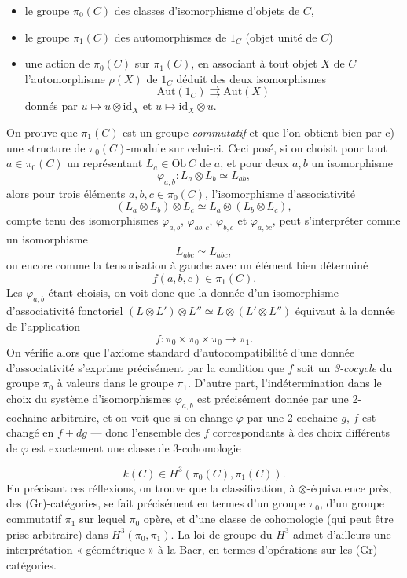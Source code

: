 \documentclass[11pt,a4paper]{article}
\begin{document}
\begin{itemize}
\item[a)] le groupe $\pi_0(C)$ des classes d'isomorphisme d'objets de $C$,
\item[b)] le groupe $\pi_1(C)$ des automorphismes de $1_C$ (objet unité de
$C$)
\item[c)] une action de $\pi_0(C)$ sur $\pi_1(C)$, en associant à tout objet
$X$ de $C$ l'automorphisme $\rho(X)$ de $1_C$ déduit des deux isomorphismes
\[ \mathrm{Aut}(1_C) \rightrightarrows \mathrm{Aut}(X) \]
donnés par $u \mapsto u \otimes \mathrm{id}_X$ et $u \mapsto \mathrm{id}_X
\otimes u$.
\end{itemize}

On prouve que $\pi_1(C)$ est un groupe \emph{commutatif} et que l'on obtient
bien par c) une structure de $\pi_0(C)$-module sur celui-ci. Ceci posé, si
on choisit pour tout $a \in \pi_0(C)$ un représentant $L_a \in \mathrm{Ob}\,
C$ de $a$, et pour deux $a, b$ un isomorphisme
\[ \varphi_{a,b} : L_a \otimes L_b \simeq L_{ab} , \]
alors pour trois éléments $a, b, c \in \pi_0(C)$, l'isomorphisme
d'associativité
\[ (L_a \otimes L_b) \otimes L_c \simeq L_a \otimes (L_b \otimes L_c) , \]
compte tenu des isomorphismes $\varphi_{a,b}$, $\varphi_{ab,c}$,
$\varphi_{b,c}$ et $\varphi_{a,bc}$, peut s'interpréter comme un
isomorphisme
\[ L_{abc} \simeq L_{abc} , \]
ou encore comme la tensorisation à gauche avec un élément bien déterminé
\[ f(a,b,c) \in \pi_1(C) . \]
Les $\varphi_{a,b}$ étant choisis, on voit donc que la donnée d'un
isomorphisme d'associativité fonctoriel $(L \otimes L') \otimes L'' \simeq
L \otimes (L' \otimes L'')$ équivaut à la donnée de l'application
\[ f : \pi_0 \times \pi_0 \times \pi_0 \longrightarrow \pi_1 . \]
On vérifie alors que l'axiome standard d'autocompatibilité d'une donnée
d'associativité  s'exprime précisément par la
condition que $f$ soit un \emph{3-cocycle} du groupe $\pi_0$ à valeurs dans
le groupe $\pi_1$. D'autre part, l'indétermination dans le choix du système
d'isomorphismes $\varphi_{a,b}$ est précisément donnée par une 2-cochaine
arbitraire, et on voit que si on change $\varphi$ par une 2-cochaine $g$,
$f$ est changé en $f + dg$ --- donc l'ensemble des $f$ correspondants à des
choix différents de $\varphi$ est exactement une classe de 3-cohomologie

\[ k(C) \in H^3(\pi_0(C), \pi_1(C)) . \]
En précisant ces réflexions, on trouve que la classification, à
$\otimes$-équivalence près, des (Gr)-catégories, se fait précisément en
termes d'un groupe $\pi_0$, d'un groupe commutatif $\pi_1$ sur lequel
$\pi_0$ opère, et d'une classe de cohomologie (qui peut être prise
arbitraire) dans $H^3(\pi_0, \pi_1)$. La loi de groupe du $H^3$ admet
d'ailleurs une interprétation « géométrique » à la Baer, en termes
d'opérations sur les (Gr)-catégories.
\end{document}
